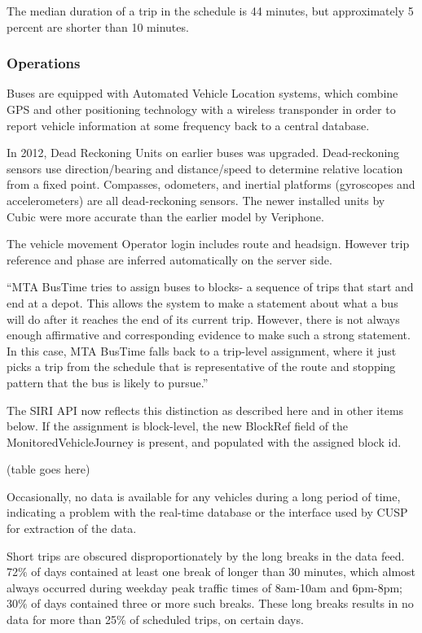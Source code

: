 \documentclass[12pt,journal,compsoc]{IEEEtran}
\begin{document}
The median duration of a trip in the schedule is 44 minutes, but approximately 5 percent are shorter than 10 minutes.  

\subsubsection{Operations}

Buses are equipped with Automated Vehicle Location systems, which combine GPS and other positioning technology with a wireless transponder in order to report vehicle information at some frequency back to a central database.

In 2012, Dead Reckoning Units on earlier buses was upgraded. Dead-reckoning sensors use direction/bearing and distance/speed to determine relative location from a fixed point. Compasses, odometers, and inertial platforms (gyroscopes and accelerometers) are all dead-reckoning sensors.  The newer installed units by Cubic were more accurate than the earlier model by Veriphone.

The vehicle movement Operator login includes route and headsign.  However trip reference and phase are inferred automatically on the server side.

“MTA BusTime tries to assign buses to blocks- a sequence of trips that start and end at a depot.  This allows the system to make a statement about what a bus will do after it reaches the end of its current trip.   However, there is not always enough affirmative and corresponding evidence to make such a strong statement.  In this case, MTA BusTime falls back to a trip-level assignment, where it just picks a trip from the schedule that is representative of the route and stopping pattern that the bus is likely to pursue.”

The SIRI API now reflects this distinction as described here and in other items below.  If the assignment is block-level, the new BlockRef field of the MonitoredVehicleJourney is present, and populated with the assigned block id.

(table goes here)

Occasionally, no data is available for any vehicles during a long period of time, indicating a problem with the real-time database or the interface used by CUSP for extraction of the data.

Short trips are obscured disproportionately by the long breaks in the data feed.  72$\%$ of days contained at least one break of longer than 30 minutes, which almost always occurred during weekday peak traffic times of 8am-10am and 6pm-8pm; 30$\%$ of days contained three or more such breaks.   These long breaks results in no data for more than 25$\%$ of scheduled trips, on certain days.
\end{document}
